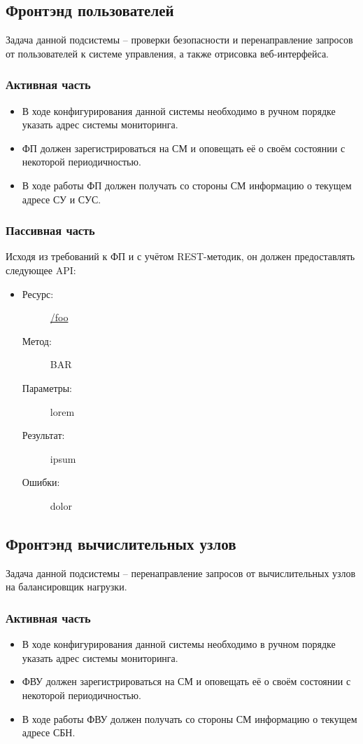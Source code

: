 \documentclass[a4paper,12pt]{report}
\numberwithin{equation}{section}
\begin{document}
\subsection{Фронтэнд пользователей}
Задача данной подсистемы -- проверки безопасности и перенаправление запросов от пользователей к системе управления, а также отрисовка веб-интерфейса.

\subsubsection{Активная часть}
\begin{itemize}
  \item В ходе конфигурирования данной системы необходимо в ручном порядке указать адрес системы мониторинга.
  \item ФП должен зарегистрироваться на СМ и оповещать её о своём состоянии с некоторой периодичностью.
  \item В ходе работы ФП должен получать со стороны СМ информацию о текущем адресе СУ и СУС.
\end{itemize}

\subsubsection{Пассивная часть}
Исходя из требований к ФП и с учётом REST-методик, он должен предоставлять следующее API:

\begin{itemize}
  \item
  \begin{description}
    \item[Ресурс:] \url{/foo}
    \item[Метод:] BAR
    \item[Параметры:] lorem
    \item[Результат:] ipsum
    \item[Ошибки:] dolor
  \end{description}
\end{itemize}

\subsection{Фронтэнд вычислительных узлов}
Задача данной подсистемы -- перенаправление запросов от вычислительных узлов на балансировщик нагрузки.

\subsubsection{Активная часть}
\begin{itemize}
  \item В ходе конфигурирования данной системы необходимо в ручном порядке указать адрес системы мониторинга.
  \item ФВУ должен зарегистрироваться на СМ и оповещать её о своём состоянии с некоторой периодичностью.
  \item В ходе работы ФВУ должен получать со стороны СМ информацию о текущем адресе СБН.
\end{itemize}
\end{document}
